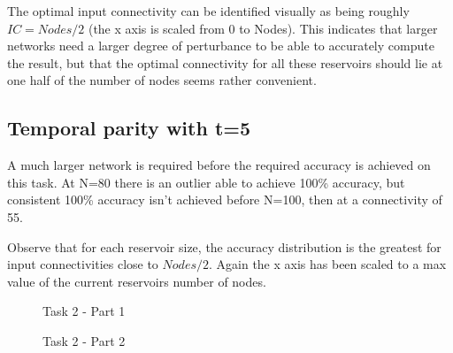 The optimal input connectivity can be identified visually as being roughly $IC = Nodes / 2$ (the x axis is scaled from 0 to Nodes).
This indicates that larger networks need a larger degree of perturbance to be able to accurately compute the result,
but that the optimal connectivity for all these reservoirs should lie at one half of the number of nodes seems rather convenient.

\subsection{Temporal parity with t=5}

A much larger network is required before the required accuracy is achieved on this task.
At N=80 there is an outlier able to achieve 100\% accuracy, but consistent 100\% accuracy isn't achieved before N=100, then at a connectivity of 55.

Observe that for each reservoir size, the accuracy distribution is the greatest for input connectivities close to $Nodes / 2$.
Again the x axis has been scaled to a max value of the current reservoirs number of nodes.

\begin{figure*}[ht]
    \centering
    \resizebox{\textwidth}{!}{
        \subfloat[N=10]{
            
        }
        \subfloat[N=15]{
            
        }
    }
    \resizebox{\textwidth}{!}{
        \subfloat[N=20]{
            
        }
        \subfloat[N=25]{
            
        }
    }
    \resizebox{\textwidth}{!}{
        \subfloat[N=30]{
            
        }
        \subfloat[N=35]{
            
        }
    }
    \caption{Task 2 - Part 1}
\end{figure*}

\begin{figure*}[ht]
    \centering
    \resizebox{\textwidth}{!}{
        \subfloat[N=40]{
            
        }
        \subfloat[N=45]{
            
        }
    }
    \resizebox{\textwidth}{!}{
        \subfloat[N=50]{
            
        }
        \subfloat[N=55]{
            
        }
    }
    \resizebox{\textwidth}{!}{
        \subfloat[N=60]{
            
        }
        \subfloat[N=65]{
            
        }
    }
    \caption{Task 2 - Part 2}
\end{figure*}

